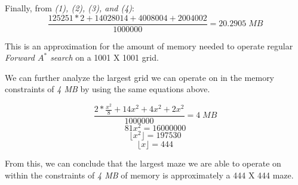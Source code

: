 Finally, from \emph{(1), (2), (3), and (4)}:
\begin{equation}
\frac{125251 * 2 + 14028014 + 4008004 + 2004002}{1000000} = 20.2905\; MB \tag{5}
\end{equation}

This is an approximation for the amount of memory needed to operate regular \emph{Forward $A^*$ search} on a 1001 X 1001 grid.


We can further analyze the largest grid we can operate on in the memory constraints of \emph{4 MB} by using the same equations above.

\begin{equation}
 \frac{2 * \frac{x^2}{8} + 14x^2 + 4x^2 + 2x^2}{1000000} = 4 \; MB \tag{6}
\end{equation}
\begin{equation}
 81x^2 = 16000000 \tag{7}
\end{equation}
\begin{equation}
 \lfloor x^2 \rfloor = 197530 \tag{8}
\end{equation}
\begin{equation}
 \lfloor x \rfloor = 444 \tag{9}
\end{equation}

From this, we can conclude that the largest maze we are able to operate on within the constraints of \emph{4 MB} of memory is approximately a 444 X 444 maze.